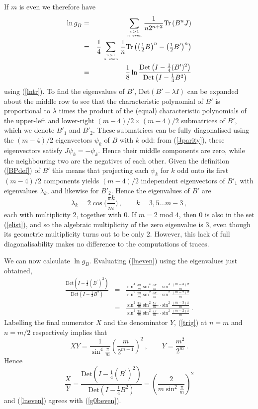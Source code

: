 \documentclass[11pt]{article}
\newcommand\phup{^{\phantom o}}
\newcommand\beq{\begin{equation}}
\newcommand\eeq{\end{equation}}
\newcommand\beqa{\begin{eqnarray}}
\newcommand\eeqa{\end{eqnarray}}
\newcommand\nn{\nonumber}
\newcommand\half{{\textstyle\frac{1}{2}}}
\newcommand{\goB}{g\phup_{B}}
\begin{document}
If $m$ is even we therefore have
\begin{eqnarray}
 \ln \goB&=&
\sum_{n>1\atop n~{\rm even}}
\frac{1}{n2^{n+2}}\mbox{Tr}\,(B^nJ)\nn \\
&=&\frac{1}{4}
\sum_{n>1\atop n~{\rm even}}
\frac{1}{n}\mbox{Tr}\left(\left(\half
B\right)^n-\left(\half B^{\prime}\right)^n\right)\nn\\
&=&\frac{1}{8}\ln
\frac{\mbox{Det}\left(I-\frac{1}{4}(B^{\prime})^2\right)}%
{\mbox{Det}\left(I-\frac{1}{4}B^2\right)}
\label{lneven}
\end{eqnarray}
using (\ref{lntr}).
To find the eigenvalues of $B'$, $\mbox{Det}(B'-\lambda I)$ can be
expanded
about the middle row to see that the characteristic polynomial of $B'$ 
is proportional to $\lambda$ times the product of the (equal)
characteristic polynomials of the upper-left and lower-right 
$(m{-}4)/2\times (m{-}4)/2$ submatrices of $B'$, which we denote
$B'_1$ and $B'_2$. These submatrices can
be fully diagonalised using the $(m{-}4)/2$ eigenvectors $\psi_k$
of $B$ with $k$ odd: from (\ref{Jparity}), these eigenvectors satisfy
$J\psi_k=-\psi_k$. Hence their middle
components are zero, while the neighbouring two are the
negatives of each other. Given the definition (\ref{BPdef}) of $B'$
this means that projecting each $\psi_k$ for $k$ odd
onto its first $(m{-}4)/2$
components yields $(m{-}4)/2$ independent eigenvectors of $B'_1$
with eigenvalues $\lambda_k$, and likewise for $B'_2$. 
Hence the eigenvalues of $B'$ are
\beq
\lambda_k=2\cos\bigl(\frac{\pi k}{m}\bigr)\,,\qquad k=3,5\dots m{-}3\,,
\label{elist}
\eeq
each with multiplicity $2$, together with $0$.
If $m=2$ mod $4$, then $0$ is also in
the set (\ref{elist}), and so
the algebraic multiplicity of the zero eigenvalue is $3$, even though its 
geometric multiplicity turns out to be only $2$. However, this lack of full 
diagonalisability makes no difference to the computations of traces.

We can now calculate $\ln \goB$. Evaluating
(\ref{lneven}) using the eigenvalues just obtained,
\beqa
 \frac{\mbox{Det}\left(I-\frac{1}{4}(B^{\prime})^2\right)}%
{\mbox{Det}\left(I-\frac{1}{4}B^2\right)}&=&
\frac{\sin^4\frac{3\pi}{m}\sin^4\frac{5\pi}{m}\cdots
\sin^4\frac{(m-3)\pi}{m}}{\sin^2\frac{2\pi}{m}\sin^2
\frac{3\pi}{m}\cdots\sin^2\frac{(m-2)\pi}{m}}\nn\\
&=&\frac{\sin^2\frac{3\pi}{m}\sin^2\frac{5\pi}{m}\cdots
\sin^2\frac{(m-3)\pi}{m}}{\sin^2\frac{2\pi}{m}\sin^2
\frac{4\pi}{m}\cdots\sin^2\frac{(m-2)\pi}{m}}\,.
\label{frac1}
\eeqa
Labelling the final numerator $X$ and the denominator $Y$,
(\ref{trig}) at $n=m$ and $n=m/2$ respectively implies that
\beq
XY=\frac{1}{\sin^4\frac{\pi}{m}}\left(\frac{m}{2^{m-1}}\right)^2~,\qquad
Y=\frac{m^2}{2^{m}}\,.
\eeq
Hence
\beq 
\frac{X}{Y}=\frac{\mbox{Det}\left(I-\frac{1}{4}(B^{\prime})^2\right)}%
{\mbox{Det}\left(I-\frac{1}{4}B^2\right)}=
\left(\frac{2}{m\sin^2\frac{\pi}{m}}\right)^2
\eeq
\nobreak
and (\ref{lneven}) agrees with (\ref{g0beven}). 
\goodbreak
\end{document}
